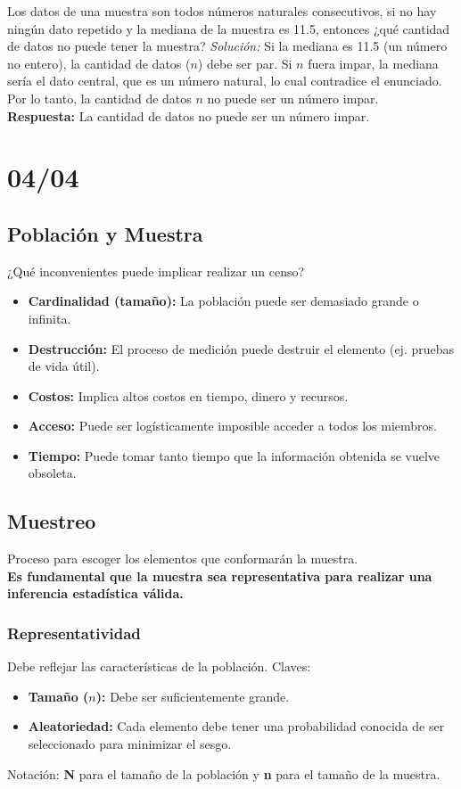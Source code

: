\documentclass[12pt, letterpaper]{article}
\begin{document}
\vspace{1em}
\noindent Los datos de una muestra son todos números naturales consecutivos, si no hay ningún dato repetido y la mediana de la muestra es 11.5, entonces ¿qué cantidad de datos no puede tener la muestra?
\textit{Solución:}
Si la mediana es 11.5 (un número no entero), la cantidad de datos ($n$) debe ser par. Si $n$ fuera impar, la mediana sería el dato central, que es un número natural, lo cual contradice el enunciado.
Por lo tanto, la cantidad de datos $n$ no puede ser un número impar. \\
\textbf{Respuesta:} La cantidad de datos no puede ser un número impar.
\newpage

\section{04/04}
\subsection{Población y Muestra}
¿Qué inconvenientes puede implicar realizar un censo?
\begin{itemize}
    \item \textbf{Cardinalidad (tamaño):} La población puede ser demasiado grande o infinita.
    \item \textbf{Destrucción:} El proceso de medición puede destruir el elemento (ej. pruebas de vida útil).
    \item \textbf{Costos:} Implica altos costos en tiempo, dinero y recursos.
    \item \textbf{Acceso:} Puede ser logísticamente imposible acceder a todos los miembros.
    \item \textbf{Tiempo:} Puede tomar tanto tiempo que la información obtenida se vuelve obsoleta.
\end{itemize}

\subsection{Muestreo}
Proceso para escoger los elementos que conformarán la muestra. \\
\textbf{Es fundamental que la muestra sea representativa para realizar una inferencia estadística válida.}

\subsubsection{Representatividad}
Debe reflejar las características de la población. Claves:
\begin{itemize}
    \item \textbf{Tamaño ($n$):} Debe ser suficientemente grande.
    \item \textbf{Aleatoriedad:} Cada elemento debe tener una probabilidad conocida de ser seleccionado para minimizar el sesgo.
\end{itemize}
Notación: \textbf{N} para el tamaño de la población y \textbf{n} para el tamaño de la muestra.
\end{document}
